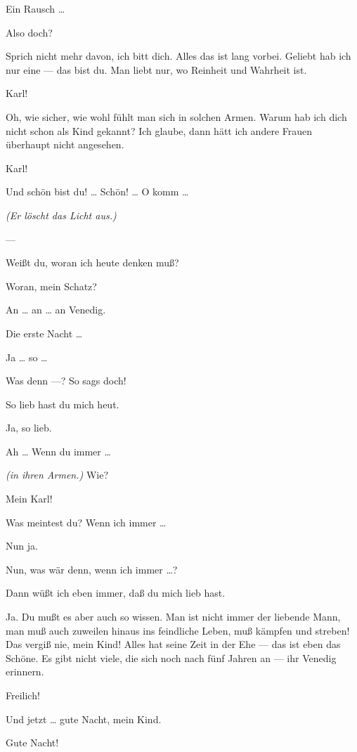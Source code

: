 \documentclass[
	final,
	a4paper,
	ngerman,
	mpinclude = true, %
	twoside = true,
	open = right,
	cleardoublepage = plain,
	DIV = 13,
	BCOR = 1cm,
	titlepage = firstiscover,
	]{scrbook}
\newcommand{\direction}[1]{\textit{(#1)}}
\newcommand{\hiat}{---}
\newcommand{\thecharacter}[1]{\textup{\textsc{#1}}}
\newcommand{\thefrau}{\thecharacter{Junge Frau}}
\newcommand{\thegatte}{\thecharacter{Gatte}}
\newcommand{\character}[1]{\item[#1:]}
\newcommand{\frau}{\character{\thefrau}}
\newcommand{\gatte}{\character{\thegatte}}
\begin{document}
\begin{play}
	\gatte
	Ein Rausch \ldots{}

	\frau
	Also doch?

	\gatte
	Sprich nicht mehr davon, ich bitt dich. Alles das ist lang vorbei. Geliebt hab ich nur eine --- das bist du. Man liebt nur, wo Reinheit und Wahrheit ist.

	\frau
	Karl!

	\gatte
	Oh, wie sicher, wie wohl fühlt man sich in solchen Armen. Warum hab ich dich nicht schon als Kind gekannt? Ich glaube, dann hätt ich andere Frauen überhaupt nicht angesehen.

	\frau
	Karl!

	\gatte
	Und schön bist du! \ldots{} Schön! \ldots{} O komm \ldots{}

	\direction{Er löscht das Licht aus.}

	\hiat

	\frau
	Weißt du, woran ich heute denken muß?

	\gatte
	Woran, mein Schatz?

	\frau
	An \ldots{} an \ldots{} an Venedig.

	\gatte
	Die erste Nacht \ldots{}

	\frau
	Ja \ldots{} so \ldots{}

	\gatte
	Was denn ---? So sags doch!

	\frau
	So lieb hast du mich heut.

	\gatte
	Ja, so lieb.

	\frau
	Ah \ldots{} Wenn du immer \ldots{}

	\gatte
	\direction{in ihren Armen.} Wie?

	\frau
	Mein Karl!

	\gatte
	Was meintest du? Wenn ich immer \ldots{}

	\frau
	Nun ja.

	\gatte
	Nun, was wär denn, wenn ich immer \ldots{}?

	\frau
	Dann wüßt ich eben immer, daß du mich lieb hast.

	\gatte
	Ja. Du mußt es aber auch so wissen. Man ist nicht immer der liebende Mann, man muß auch zuweilen hinaus ins feindliche Leben, muß kämpfen und streben! Das vergiß nie, mein Kind! Alles hat seine Zeit in der Ehe --- das ist eben das Schöne. Es gibt nicht viele, die sich noch nach fünf Jahren an --- ihr Venedig erinnern.

	\frau
	Freilich!

	\gatte
	Und jetzt \ldots{} gute Nacht, mein Kind.

	\frau
	Gute Nacht!

\end{play}
\end{document}
